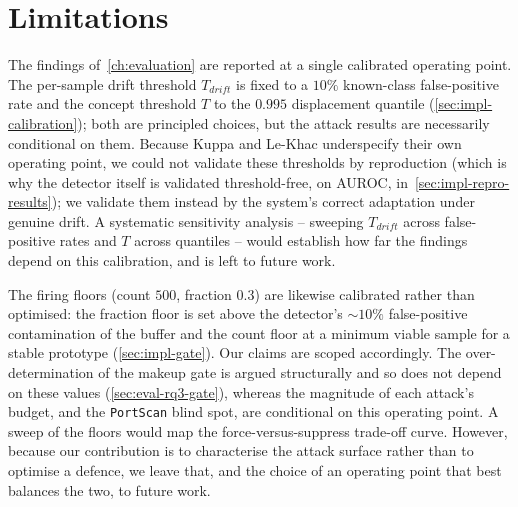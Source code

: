 \section{Limitations}
\label{sec:conc-limitations}
The findings of~\cref{ch:evaluation} are reported at a single calibrated operating point. The per-sample drift threshold $T_{drift}$ is fixed to a $10\%$ known-class false-positive rate and the concept threshold $T$ to the $0.995$ displacement quantile (\cref{sec:impl-calibration}); both are principled choices, but the attack results are necessarily conditional on them. Because Kuppa and Le-Khac underspecify their own operating point, we could not validate these thresholds by reproduction (which is why the detector itself is validated threshold-free, on AUROC, in~\cref{sec:impl-repro-results}); we validate them instead by the system's correct adaptation under genuine drift. A systematic sensitivity analysis -- sweeping $T_{drift}$ across false-positive rates and $T$ across quantiles -- would establish how far the findings depend on this calibration, and is left to future work.

The firing floors (count $500$, fraction $0.3$) are likewise calibrated rather than optimised: the fraction floor is set above the detector's $\sim$$10\%$ false-positive contamination of the buffer and the count floor at a minimum viable sample for a stable prototype (\cref{sec:impl-gate}). Our claims are scoped accordingly. The over-determination of the makeup gate is argued structurally and so does not depend on these values (\cref{sec:eval-rq3-gate}), whereas the magnitude of each attack's budget, and the \texttt{PortScan} blind spot, are conditional on this operating point. A sweep of the floors would map the force-versus-suppress trade-off curve. However, because our contribution is to characterise the attack surface rather than to optimise a defence, we leave that, and the choice of an operating point that best balances the two, to future work.

